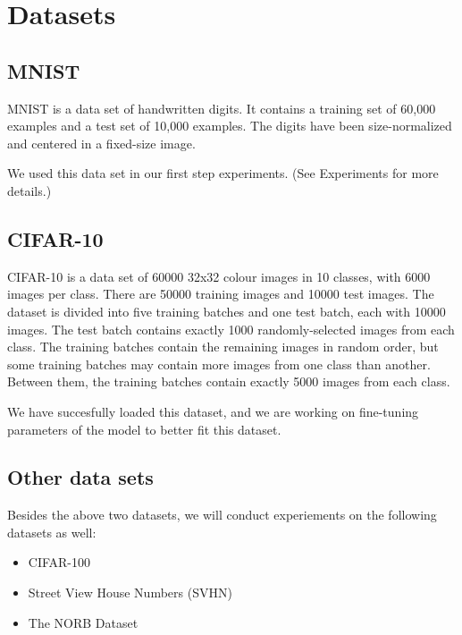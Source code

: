 \section{Datasets}
\label{sec:meth}


\subsection{MNIST}
MNIST is a data set of handwritten digits. It contains a training set of
60,000 examples and a test set of 10,000 examples. The digits have been
size-normalized and centered in a fixed-size image.

We used this data set in our first step experiments. (See Experiments for
more details.)

\subsection{CIFAR-10}
CIFAR-10 is a data set of 60000 32x32 colour images in 10 classes, with
6000 images per class. There are 50000 training images and 10000 test
images. The dataset is divided into five training batches and one test
batch, each with 10000 images. The test batch contains exactly 1000
randomly-selected images from each class. The training batches contain the
remaining images in random order, but some training batches may contain
more images from one class than another. Between them, the training
batches contain exactly 5000 images from each class.

We have succesfully loaded this dataset, and we are working on
fine-tuning parameters of the model to better fit this dataset.

\subsection{Other data sets}
Besides the above two datasets, we will conduct experiements on the
following datasets as well:
\begin{itemize}
\vspace{-7pt}
\item CIFAR-100 \\
\vspace{-7pt}
\item Street View House Numbers (SVHN)\\
\vspace{-7pt}
\item The NORB Dataset
\end{itemize}

